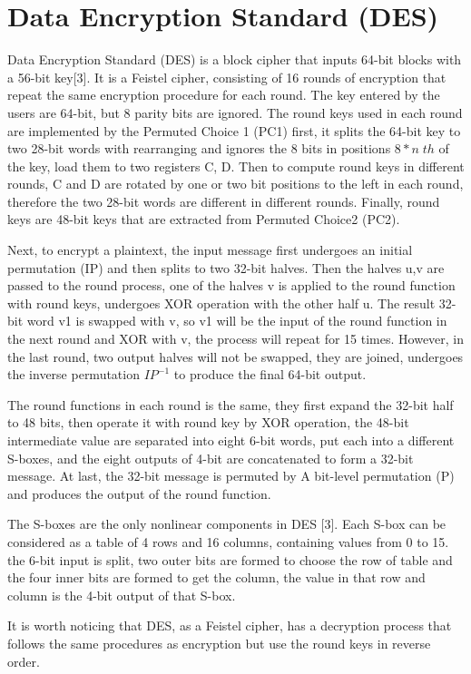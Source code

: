 \documentclass{article}
\begin{document}
\section{Data Encryption Standard (DES)}
Data Encryption Standard (DES) is a block cipher that inputs 64-bit blocks with a 56-bit key[3]. It is a Feistel cipher, consisting
of 16 rounds of encryption that repeat the same encryption procedure for each round. The key entered by the users are 64-bit, but 8
parity bits are ignored. The round keys used in each round are implemented
by the Permuted Choice 1 (PC1) first, it splits the 64-bit key to two 28-bit words with rearranging
and ignores the 8 bits in positions $8*n \;th$ of the key, load them to two registers C, D. Then to compute round keys
in different rounds, C and D are rotated by
one or two bit positions to the left in each round, therefore the two 28-bit words are different in different rounds. Finally,
round keys are 48-bit keys that are extracted from Permuted Choice2 (PC2).

Next, to encrypt a plaintext, the input message first undergoes
an initial permutation (IP) and then splits to two 32-bit halves. Then the halves u,v are passed to the round process, one of the halves v
is applied to the round function with round keys, undergoes XOR operation with the other half u. The result 32-bit word v1 is swapped with v,
so v1 will be the input of the round function in the next round and XOR with v, the process will repeat for 15 times. However,
in the last round, two output halves will not be swapped, they are joined, undergoes the inverse permutation $IP^{-1}$ to produce
the final 64-bit output.

The round functions in each round is the same, they first expand the 32-bit half to 48 bits, then operate it with round key by
XOR operation, the 48-bit intermediate value are separated into eight 6-bit words, put each into a different S-boxes, and
the eight outputs of 4-bit are concatenated to form a 32-bit message. At last, the 32-bit message is permuted by
A bit-level permutation (P) and produces the output of the round function.

The S-boxes are the only nonlinear components in DES [3]. Each S-box can be considered as a table of 4 rows and 16 columns, containing values from 0 to 15.
the 6-bit input is split, two outer bits are formed to choose the row of table and the four inner bits are formed to get the
column, the value in that row and column is the 4-bit output of that S-box.

It is worth noticing that DES, as a Feistel cipher, has a decryption process that follows the same procedures as encryption
but use the round keys in reverse order.
\end{document}
